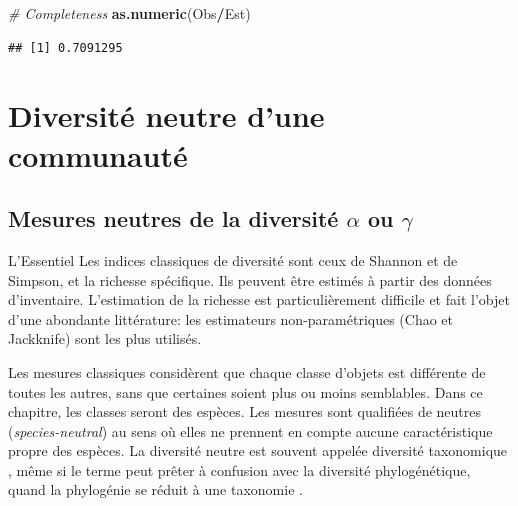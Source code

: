 \documentclass[
  11pt,
  french,
  a4paper,
  extrafontsizes,onecolumn,openright
  ]{memoir}
\newenvironment{Shaded}{\begin{snugshade}}{\end{snugshade}}
\newcommand{\CommentTok}[1]{\textcolor[rgb]{0.56,0.35,0.01}{\textit{#1}}}
\newcommand{\KeywordTok}[1]{\textcolor[rgb]{0.13,0.29,0.53}{\textbf{#1}}}
\newcommand{\NormalTok}[1]{#1}
\newcommand{\OperatorTok}[1]{\textcolor[rgb]{0.81,0.36,0.00}{\textbf{#1}}}
\newenvironment{Summary}
  {\begin{bclogo}[logo=\bctrombone, noborder=true, couleur=lightgray!50]{L'Essentiel}\parindent0pt}
  {\end{bclogo}}
\begin{document}
\begin{Shaded}
\begin{Highlighting}[]
\CommentTok{# Completeness}
\KeywordTok{as.numeric}\NormalTok{(Obs}\OperatorTok{/}\NormalTok{Est)}
\end{Highlighting}
\end{Shaded}

\begin{verbatim}
## [1] 0.7091295
\end{verbatim}

\normalsize

\hypertarget{part-diversituxe9-neutre-dune-communautuxe9}{%
\part{Diversité neutre d'une communauté}\label{part-diversituxe9-neutre-dune-communautuxe9}}

\hypertarget{chap:MesuresNeutres}{%
\chapter{\texorpdfstring{Mesures neutres de la diversité \(\alpha\) ou \(\gamma\)}{Mesures neutres de la diversité \textbackslash alpha ou \textbackslash gamma}}\label{chap:MesuresNeutres}}

\scriptsize

\normalsize

\scriptsize

\begin{Summary}
Les indices classiques de diversité sont ceux de Shannon et de Simpson,
et la richesse spécifique. Ils peuvent être estimés à partir des données
d'inventaire. L'estimation de la richesse est particulièrement difficile
et fait l'objet d'une abondante littérature: les estimateurs
non-paramétriques (Chao et Jackknife) sont les plus utilisés.
\end{Summary}

\normalsize

Les mesures classiques \autocite{Peet1974} considèrent que chaque classe d'objets est différente de toutes les autres, sans que certaines soient plus ou moins semblables.
Dans ce chapitre, les classes seront des espèces.
Les mesures sont qualifiées de neutres (\emph{species-neutral}) au sens où elles ne prennent en compte aucune caractéristique propre des espèces.
La diversité neutre est souvent appelée diversité taxonomique \autocite{Devictor2010,Stegen2011}, même si le terme peut prêter à confusion avec la diversité phylogénétique, quand la phylogénie se réduit à une taxonomie \autocite{Clarke2001,Ricotta2003c}.
\end{document}
